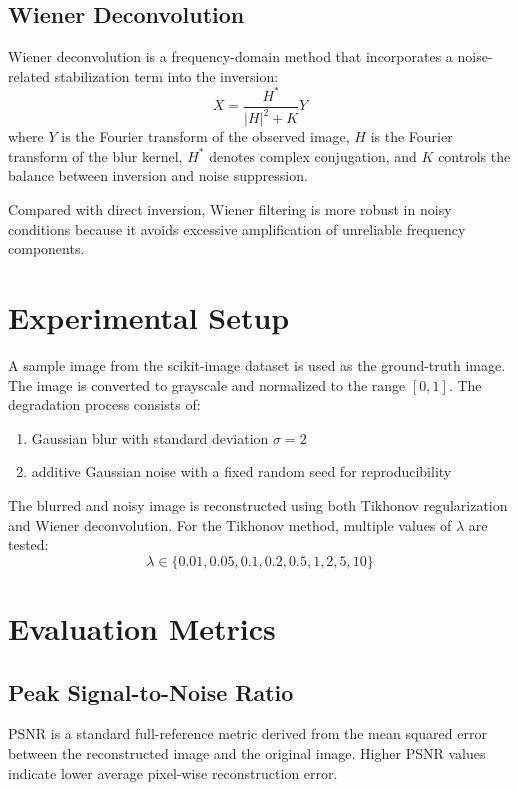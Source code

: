 \documentclass[conference]{IEEEtran}
\begin{document}
	\subsection{Wiener Deconvolution}
	Wiener deconvolution is a frequency-domain method that incorporates a noise-related stabilization term into the inversion:
	\begin{equation}
		X = \frac{H^*}{|H|^2 + K}Y
	\end{equation}
	where $Y$ is the Fourier transform of the observed image, $H$ is the Fourier transform of the blur kernel, $H^*$ denotes complex conjugation, and $K$ controls the balance between inversion and noise suppression.
	
	Compared with direct inversion, Wiener filtering is more robust in noisy conditions because it avoids excessive amplification of unreliable frequency components.
	
	\section{Experimental Setup}
	A sample image from the scikit-image dataset is used as the ground-truth image. The image is converted to grayscale and normalized to the range $[0,1]$. The degradation process consists of:
	\begin{enumerate}
		\item Gaussian blur with standard deviation $\sigma = 2$
		\item additive Gaussian noise with a fixed random seed for reproducibility
	\end{enumerate}
	
	The blurred and noisy image is reconstructed using both Tikhonov regularization and Wiener deconvolution. For the Tikhonov method, multiple values of $\lambda$ are tested:
	\begin{equation}
		\lambda \in \{0.01, 0.05, 0.1, 0.2, 0.5, 1, 2, 5, 10\}
	\end{equation}
	
	\section{Evaluation Metrics}
	
	\subsection{Peak Signal-to-Noise Ratio}
	PSNR is a standard full-reference metric derived from the mean squared error between the reconstructed image and the original image. Higher PSNR values indicate lower average pixel-wise reconstruction error.
	
\end{document}
